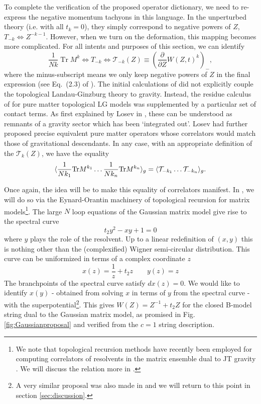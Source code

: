 \documentclass[english]{article}
\DeclareMathOperator{\Tr}{Tr}
\begin{document}
To complete the verification of the proposed operator dictionary, we need to re-express the negative momentum tachyons in this language. In the unperturbed theory (i.e. with all $t_{k}=0$), they simply correspond to negative powers of $Z$, $T_{-k} \Leftrightarrow Z^{-k-1}$. However, when we turn on the deformation, this mapping becomes more complicated. For all intents and purposes of this section, we can identify 
\begin{equation}
\frac{1}{Nk} \Tr M^{k} \Leftrightarrow T_{-k} \Leftrightarrow  {\mathcal T}_{-k}(Z) \equiv \left( \frac{\partial}{\partial Z}  W(Z,t)^{k}\right)_{-},
\end{equation}
where the minus-subscript means we only keep negative powers of $Z$ in the final expression (see Eq.~(2.3) of \cite{ghoshalMukhiIm}). 
The initial calculations of \cite{ghoshalMukhiLG, hananyOzPlLG} did not explicitly couple the topological Landau-Ginzburg theory to gravity. Instead, the residue calculus of \cite{vafatopLG} for pure matter topological LG models was supplemented by a particular set of contact terms. As first explained by Losev in \cite{losev1993descendants}, these can be understood as remnants of a gravity sector which has been `integrated out'. Losev had further proposed precise equivalent pure matter operators whose correlators would match those of gravitational descendants. In any case, with an appropriate definition of the ${\mathcal T}_k(Z)$, we have the equality
\begin{equation}
    \langle\frac{1}{N k_1 }{\rm Tr}M^{k_1}\ldots \frac{1}{N k_n }{\rm Tr}M^{k_n} \rangle_g = \langle\mathcal{T}_{-k_1}\ldots \mathcal{T}_{-k_n}\rangle_g.
\end{equation}

Once again, the idea will be to make this equality of correlators manifest. 
In \cite{DSDII}, we will do so via the  Eynard-Orantin machinery of topological recursion for matrix models\footnote{We note that topological recursion methods have recently been employed for computing correlators of resolvents in the matrix ensemble dual to JT gravity \cite{SSSJTmatrix}.  We will discuss the relation more in \cite{DSDIII}.}.  The large $N$ loop equations of the Gaussian matrix model give rise to the spectral curve
\begin{equation}
   t_2 y^2 - x y + 1 = 0 
\end{equation}
where $y$ plays the role of the resolvent. 
Up to a linear redefinition of $(x,y)$ this is nothing other than the (complexified) Wigner semi-circular distribution. 
This curve can be uniformized in terms of a complex coordinate $z$ 
\begin{equation}
    x(z) = \frac{1}{z}+t_2 z \quad \quad y(z) = z
\end{equation}
The branchpoints of the spectral curve satisfy $dx(z)=0$. We would like to identify $x(y)$ - obtained from solving $x$ in terms of $y$ from the spectral curve - with the superpotential\footnote{A very similar proposal was also made in \cite{Aganagic_2005} and we will return to this point in section \ref{sec:discussion}.}. This gives $W(Z)=Z^{-1}+ t_2 Z$ for the closed B-model string dual to the Gaussian matrix model, as promised in Fig.\ref{fig:Gaussianproposal} and verified from the $c=1$ string description. 
\end{document}
